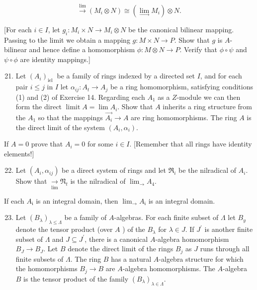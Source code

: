 \documentclass{standalone}
\theoremstyle{definition}
\theoremstyle{remark}
\begin{document}
\[
\stackrel{\lim }{\longrightarrow}\left(M_{i} \otimes N\right) \cong\left(\lim _{\longrightarrow} M_{i}\right) \otimes N .
\]

[For each $i \in I$, let $g_{i}: M_{i} \times N \rightarrow M_{i} \otimes N$ be the canonical bilinear mapping. Passing to the limit we obtain a mapping $g: M \times N \rightarrow P$. Show that $g$ is $A$-bilinear and hence define a homomorphism $\phi: M \otimes N \rightarrow P$. Verify that $\phi \circ \psi$ and $\psi \circ \phi$ are identity mappings.]

\begin{enumerate}
  \setcounter{enumi}{20}
  \item Let $\left(A_{i}\right)_{\text {iel }}$ be a family of rings indexed by a directed set $I$, and for each pair $i \leqslant j$ in $I$ let $\alpha_{i j}: A_{t} \rightarrow A_{j}$ be a ring homomorphism, satisfying conditions (1) and (2) of Exercise 14. Regarding each $A_{1}$ as a $Z$-module we can then form the direct $\operatorname{limit} A=\lim A_{i}$. Show that $A$ inherits a ring structure from the $A_{1}$ so that the mappings $\overrightarrow{A_{i}} \rightarrow A$ are ring homomorphisms. The ring $A$ is the direct limit of the system $\left(A_{i}, \alpha_{i}\right)$.
\end{enumerate}

If $A=0$ prove that $A_{i}=0$ for some $i \in I$. [Remember that all rings have identity elements!]

\begin{enumerate}
  \setcounter{enumi}{21}
  \item Let $\left(A_{i}, \alpha_{i j}\right)$ be a direct system of rings and let $\mathfrak{R}_{i}$ be the nilradical of $A_{i}$. Show that $\underset{\lim }{\longrightarrow} \mathfrak{N}_{t}$ is the nilradical of $\lim _{\longrightarrow} A_{4}$.
\end{enumerate}

If each $A_{\mathfrak{i}}$ is an integral domain, then $\lim _{\longrightarrow} A_{\mathfrak{i}}$ is an integral domain.

\begin{enumerate}
  \setcounter{enumi}{22}
  \item Let $\left(B_{\lambda}\right)_{\lambda \leq \Lambda}$ be a family of $A$-algebras. For each finite subset of $\Lambda$ let $B_{y}$ denote the tensor product (over $A$ ) of the $B_{\lambda}$ for $\lambda \in J$. If $J^{\prime}$ is another finite subset of $\Lambda$ and $J \subseteq J^{\prime}$, there is a canonical $A$-algebra homomorphism $B_{J} \rightarrow B_{J}$. Let $B$ denote the direct limit of the rings $B_{j}$ as $J$ runs through all finite subsets of $\Lambda$. The ring $B$ has a natural $A$-algebra structure for which the homomorphisms $B_{j} \rightarrow B$ are $A$-algebra homomorphisms. The $A$-algebra $B$ is the tensor product of the family $\left(B_{\lambda}\right)_{\lambda \in \Lambda}$.
\end{enumerate}
\end{document}
